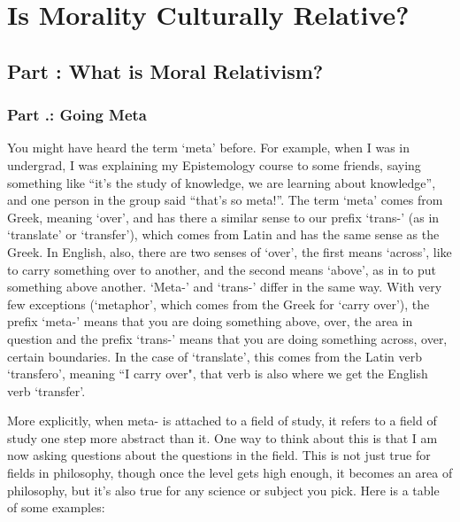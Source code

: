 \part{Is Morality Culturally Relative?}
\label{ch.modseven}

\chapter{Part \thechapcount: What is Moral Relativism?}\setcounter{seccount}{1}
\section{Part \thechapcount.\theseccount: Going Meta}

You might have heard the term ‘meta’ before. For example, when I was in undergrad, I was explaining my Epistemology course to some friends, saying something like “it’s the study of knowledge, we are learning about knowledge”, and one person in the group said “that’s so meta!”. The term ‘meta’ comes from Greek, meaning ‘over’, and has there a similar sense to our prefix ‘trans-’ (as in ‘translate’ or ‘transfer’), which comes from Latin and has the same sense as the Greek. In English, also, there are two senses of ‘over’, the first means ‘across’, like to carry something over to another, and the second means ‘above’, as in to put something above another. ‘Meta-’ and ‘trans-’ differ in the same way. With very few exceptions (‘metaphor’, which comes from the Greek for ‘carry over’), the prefix ‘meta-’ means that you are doing something above, over, the area in question and the prefix ‘trans-’ means that you are doing something across, over, certain boundaries. In the case of `translate', this comes from the Latin verb `transfero', meaning ``I carry over", that verb is also where we get the English verb `transfer'.

More explicitly, when \gls{meta-} is attached to a field of study, it refers to a field of study one step more abstract than it. One way to think about this is that I am now asking questions about the questions in the field. This is not just true for fields in philosophy, though once the level gets high enough, it becomes an area of philosophy, but it’s also true for any science or subject you pick. Here is a table of some examples:

